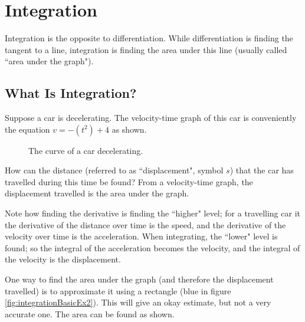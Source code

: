 \chapter{Integration}
Integration is the opposite to differentiation. While differentiation is finding the tangent to a line, integration is finding the area under this line (usually called ``area under the graph").

\section{What Is Integration?}
Suppose a car is decelerating. The velocity-time graph of this car is conveniently the equation $v=-\left(t^2\right)+4$ as shown.

\begin{figure}[h!]
	\centering
	\caption{The curve of a car decelerating.}
	\label{fig:integrationBasicEx1}
\end{figure}

How can the distance (referred to as ``displacement", symbol $s$) that the car has travelled during this time be found? From a velocity-time graph, the displacement travelled is the area under the graph.

Note how finding the derivative is finding the ``higher" level; for a travelling car it the derivative of the distance over time is the speed, and the derivative of the velocity over time is the acceleration. When integrating, the ``lower" level is found; so the integral of the acceleration becomes the velocity, and the integral of the velocity is the displacement.

One way to find the area under the graph (and therefore the displacement travelled) is to approximate it using a rectangle (blue in figure \ref{fig:integrationBasicEx2}). This will give an okay estimate, but not a very accurate one. The area can be found as shown.

